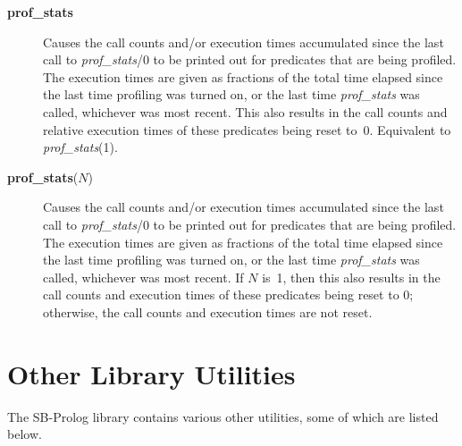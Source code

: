 \begin{description}
\item[{\bf prof\_stats}]
    Causes the call counts and/or execution times accumulated
    since the last call to {\em prof\_stats}/0 to be printed out for predicates
    that are being profiled.
    The execution times are given as fractions of the total
    time elapsed since the last time profiling was turned on,
    or the last time {\em prof\_stats} was called, whichever was most recent.
    This also results in the call counts and relative execution times of these
    predicates being reset to~0.
    Equivalent to {\em prof\_stats}(1).

\item[{\bf prof\_stats}($N$)]
    Causes the call counts and/or execution times accumulated since
    the last call to {\em prof\_stats}/0 to be printed out for predicates
    that are being profiled.
    The execution times are given as fractions of the total time elapsed since
    the last time profiling was turned on, or the last time {\em prof\_stats}
    was called, whichever was most recent.
    If $N$ is~1, then this also results in the call counts and execution times
    of these predicates being reset to 0;
    otherwise, the call counts and execution times are not reset.
\end{description}

\section{Other Library Utilities}

The SB-Prolog library contains various other utilities,
some of which are listed below.

